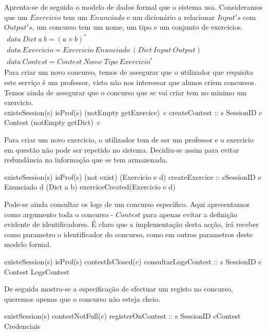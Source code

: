 Aprenta-se de seguida o modelo de dados formal que o sistema usa. Consideramos que um $Exercicio$ tem um $Enunciado$ e um dicionário a relacionar $Input's$ com $Output's$,
um concurso tem um nome, um tipo e um conjunto de exercicios.\\

$\begin{array}{l}
data~Dict~a~b = (a \times b)^{*} \\
data~Exercicio = Exercicio~Enunciado~(Dict~Input~Output) \\
data~Contest =  Contest~Nome~Tipo~Exercicio^{*}
\end{array}$\\

Para criar um novo concurso, temos de assegurar que o utilizador que requisita este serviço é um professor, visto não nos interessar que alunos criem concursos.
Temos ainda de assegurar que o concurso que se vai criar tem no minimo um exercicio.\\

\prop
{ existeSession(s)  \wedge isProf(s) \wedge (notEmpty \circ getExercice)~c}
{createContest :: s \unif SessionID \rarrow c \unif Contest }
{ (notEmpty \circ getDict)~c }

Para criar um novo exercicio, o utilizador tem de ser um professor e o exercicio em questão não pode ser repetido no sistema. Decidiu-se assim para evitar redundância
na informação que se tem armazenada.

\prop
{ existeSession(s)  \wedge isProf(s) \wedge (not \circ exist) (Exercicio e d)}
{createExercice :: s\unif SessionID \rarrow e \unif Enunciado \rarrow d \unif (Dict a b) }
{ exerciceCreated(Exercicio e d) }

Pode-se ainda consultar os logs de um concurso especifico. Aqui apresentamos como argumento toda o concurso - $Contest$ para apenas evitar a definição evidente
de identificadores. É claro que a implementação desta acção, irá receber como parametro o identificador do concurso, como em outros parametros deste modelo formal.

\prop 
{ existeSession(s) \wedge isProf(s) \wedge contestIsClosed(c) }
{consultarLogsContest :: s \unif SessionID \rarrow c \unif Contest \rarrow LogsContest}
{}

De seguida mostra-se a especificação de efectuar um registo no concurso, queremos apenas que o concurso não esteja cheio.

\prop
{ existSession(s) \wedge contestNotFull(c)}
{registerOnContest :: s \unif SessionID \rarrow c\unif Contest \rarrow Credenciais}
{ }

